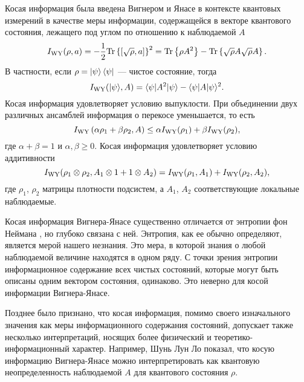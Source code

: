 Косая информация\cite{Wigner1963} была введена Вигнером и Янасе
в контексте квантовых измерений в качестве меры информации,
содержащейся в векторе квантового состояния, лежащего под углом по отношению к наблюдаемой $A$
%
\begin{equation}\label{eq:wyi}
  I_\mathrm{WY}(\rho, a)
  = -\frac{1}{2} \mathrm{Tr} \left\{ [\sqrt{\rho}, a] \right\}^2
  = \mathrm{Tr} \left\{ \rho A^2 \right\} - \mathrm{Tr} \left\{ \sqrt \rho A \sqrt \rho  A \right\}.
\end{equation}
%
В частности, если $\rho = \left| \psi \right\rangle\left\langle \psi \right|$ --- чистое состояние, тогда
%
\begin{equation}\label{eq:wyi-pure}
  I_\mathrm{WY}(| \psi \rangle, A)
  = \langle \psi | A^2 | \psi \rangle - \langle \psi | A| \psi \rangle ^2.
\end{equation}
Косая информация удовлетворяет условию выпуклости.
При объединении двух различных ансамблей информация о перекосе уменьшается, то есть
%
\begin{equation}\label{eq:wyi-convex}
  I_\mathrm{WY}\left( \alpha \rho_1 + \beta \rho_2, A \right)
  \leq \alpha I_\mathrm{WY}(\rho_1) + \beta I_\mathrm{WY}(\rho_2),
\end{equation}
где $\alpha + \beta = 1$ и $\alpha, \beta \geq 0$.
%
Косая информация удовлетворяет условию аддитивности
%
\begin{equation}\label{eq:wyi-additivity}
 I_\mathrm{WY}(\rho_1 \otimes \rho_2, A_1 \otimes 1 + 1 \otimes A_2)
 = I_\mathrm{WY}(\rho_1, A_1) + I_\mathrm{WY}(\rho_2, A_2),
\end{equation}
%
где $\rho_1$, $\rho_2$ матрицы плотности подсистем,
а $A_1$, $A_2$ соответствующие локальные наблюдаемые.
%

Косая информация Вигнера-Янасе существенно отличается от энтропии фон Неймана \cite{Wigner1952, Araki1960, Lieb1973prl, Lieb1973, Wehrl1978},
но глубоко связана с ней.
Энтропия, как ее обычно определяют, является мерой нашего незнания\cite{Weaver1949}.
Это мера, в которой знания о любой наблюдаемой величине находятся в одном ряду.
С точки зрения энтропии информационное содержание всех чистых состояний,
которые могут быть описаны одним вектором состояния, одинаково.
Это неверно для косой информации Вигнера-Янасе.

Позднее было признано, что косая информация,
помимо своего изначального значения как меры информационного содержания состояний,
допускает также несколько интерпретаций,
носящих более физический и теоретико-информационный характер.
Например, Шунь Лун Ло показал\cite{Luo2003prl, Luo2005, Luo2005pra, Luo2006, Luo2017},
что косую информацию Вигнера-Янасе можно интерпретировать
как квантовую неопределенность наблюдаемой $A$ для квантового состояния $\rho$.

